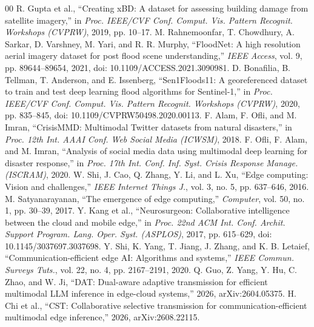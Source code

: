 \documentclass[conference,a4paper]{IEEEtran}
\begin{document}
\fi

\begin{thebibliography}{00}
\setlength{\emergencystretch}{2em}\sloppy
{}
R. Gupta et al., ``Creating xBD: A dataset for assessing building damage from satellite imagery,'' in \emph{Proc. IEEE/CVF Conf. Comput. Vis. Pattern Recognit. Workshops (CVPRW)}, 2019, pp. 10--17.
M. Rahnemoonfar, T. Chowdhury, A. Sarkar, D. Varshney, M. Yari, and R. R. Murphy, ``FloodNet: A high resolution aerial imagery dataset for post flood scene understanding,'' \emph{IEEE Access}, vol. 9, pp. 89644--89654, 2021, doi: 10.1109/ACCESS.2021.3090981.
D. Bonafilia, B. Tellman, T. Anderson, and E. Issenberg, ``Sen1Floods11: A georeferenced dataset to train and test deep learning flood algorithms for Sentinel-1,'' in \emph{Proc. IEEE/CVF Conf. Comput. Vis. Pattern Recognit. Workshops (CVPRW)}, 2020, pp. 835--845, doi: 10.1109/CVPRW50498.2020.00113.
F. Alam, F. Ofli, and M. Imran, ``CrisisMMD: Multimodal Twitter datasets from natural disasters,'' in \emph{Proc. 12th Int. AAAI Conf. Web Social Media (ICWSM)}, 2018.
F. Ofli, F. Alam, and M. Imran, ``Analysis of social media data using multimodal deep learning for disaster response,'' in \emph{Proc. 17th Int. Conf. Inf. Syst. Crisis Response Manage. (ISCRAM)}, 2020.
W. Shi, J. Cao, Q. Zhang, Y. Li, and L. Xu, ``Edge computing: Vision and challenges,'' \emph{IEEE Internet Things J.}, vol. 3, no. 5, pp. 637--646, 2016.
M. Satyanarayanan, ``The emergence of edge computing,'' \emph{Computer}, vol. 50, no. 1, pp. 30--39, 2017.
Y. Kang et al., ``Neurosurgeon: Collaborative intelligence between the cloud and mobile edge,'' in \emph{Proc. 22nd ACM Int. Conf. Archit. Support Program. Lang. Oper. Syst. (ASPLOS)}, 2017, pp. 615--629, doi: 10.1145/3037697.3037698.
Y. Shi, K. Yang, T. Jiang, J. Zhang, and K. B. Letaief, ``Communication-efficient edge AI: Algorithms and systems,'' \emph{IEEE Commun. Surveys Tuts.}, vol. 22, no. 4, pp. 2167--2191, 2020.
Q. Guo, Z. Yang, Y. Hu, C. Zhao, and W. Ji, ``DAT: Dual-aware adaptive transmission for efficient multimodal LLM inference in edge-cloud systems,'' 2026, arXiv:2604.05375.
H. Chi et al., ``CST: Collaborative selective transmission for communication-efficient multimodal edge inference,'' 2026, arXiv:2608.22115.

\end{thebibliography}
\end{document}
